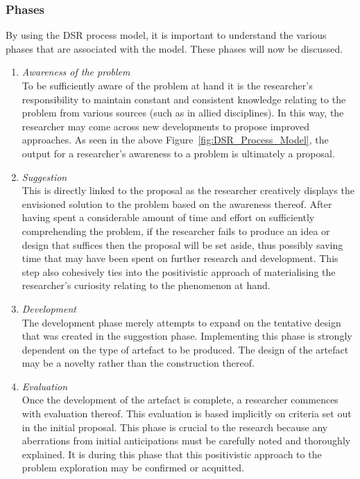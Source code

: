 \subsubsection{Phases}

By using the DSR process model, it is important to understand the various phases that are associated with the model. These phases will now be discussed.\\
\begin{enumerate}[label=\roman*.]
	\item \textit{Awareness of the problem}\\
	To be sufficiently aware of the problem at hand it is the researcher’s responsibility to maintain constant and consistent knowledge relating to the problem from various sources (such as in allied disciplines). In this way, the researcher may come across new developments to propose improved approaches. As seen in the above Figure~\ref{fig:DSR_Process_Model}, the output for a researcher’s awareness to a problem is ultimately a proposal.
	
	\item \textit{Suggestion} \\
	This is directly linked to the proposal as the researcher creatively displays the envisioned solution to the problem based on the awareness thereof. After having spent a considerable amount of time and effort on sufficiently comprehending the problem, if the researcher fails to produce an idea or design that suffices then the proposal will be set aside, thus possibly saving time that may have been spent on further research and development.
This step also cohesively ties into the positivistic approach of materialising the researcher’s curiosity relating to the phenomenon at hand.

	\item \textit{Development} \\
	The development phase merely attempts to expand on the tentative design that was created in the suggestion phase. Implementing this phase is strongly dependent on the type of artefact to be produced. The design of the artefact may be a novelty rather than the construction thereof.
	
	\item \textit{Evaluation} \\
	Once the development of the artefact is complete, a researcher commences with evaluation thereof. This evaluation is based implicitly on criteria set out in the initial proposal. This phase is crucial to the research because any aberrations from initial anticipations must be carefully noted and thoroughly explained. It is during this phase that this positivistic approach to the problem exploration may be confirmed or acquitted. 
	

\end{enumerate}
